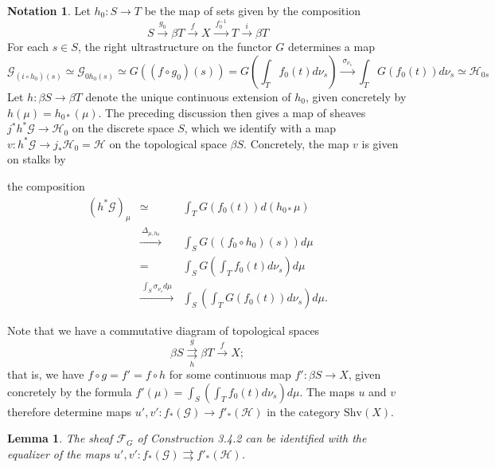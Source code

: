 \documentclass[11pt]{article}
\theoremstyle{plain}
\newtheorem{lemma}{Lemma}
\theoremstyle{definition}
\newtheorem{notation}{Notation}
\begin{document}
\begin{notation}
Let $h_0 : S \to T$ be the map of sets given by the composition
\[
S \xrightarrow{\ g_0\ } \beta T \xrightarrow{\ f\ } X \xrightarrow{\ f_0^{-1}\ } T \xrightarrow{\ i\ } \beta T
\]
For each $s \in S$, the right ultrastructure on the functor $G$ determines a map
\[
\mathscr{G}_{(i \circ h_0)(s)} \simeq \mathscr{G}_{0h_0(s)} \simeq G((f \circ g_0)(s)) = G(\int_T f_0(t)d\nu_s) \xrightarrow{\ \sigma_{\nu_s}\ } \int_T G(f_0(t))d\nu_s \simeq \mathscr{H}_{0s}
\]
Let $h : \beta S \to \beta T$ denote the unique continuous extension of $h_0$, given concretely by $h(\mu) = h_{0*}(\mu)$. The preceding discussion then gives a map of sheaves $j^*h^*\mathscr{G} \to \mathscr{H}_0$ on the discrete space $S$, which we identify with a map $v : h^*\mathscr{G} \to j_*\mathscr{H}_0 = \mathscr{H}$ on the topological space $\beta S$. Concretely, the map $v$ is given on stalks by


the composition
\[
\begin{array}{rcl}
(h^*\mathscr{G})_\mu & \simeq & \int_T G(f_0(t))d(h_{0*}\mu)\\[4pt]
& \xrightarrow{\ \Delta_{\mu,h_0}\ } & \int_S G((f_0 \circ h_0)(s))d\mu\\[4pt]
& = & \int_S G(\int_T f_0(t)d\nu_s)d\mu\\[4pt]
& \xrightarrow{\ \int_S \sigma_{\nu_s}d\mu\ } & \int_S (\int_T G(f_0(t))d\nu_s)d\mu.
\end{array}
\]
\end{notation}

Note that we have a commutative diagram of topological spaces
\[
\beta S \underset{h}{\overset{g}{\rightrightarrows}} \beta T \xrightarrow{\ f\ } X;
\]
that is, we have $f \circ g = f' = f \circ h$ for some continuous map $f' : \beta S \to X$, given concretely by the formula $f'(\mu) = \int_S (\int_T f_0(t)d\nu_s)d\mu$. The maps $u$ and $v$ therefore determine maps $u', v' : f_*(\mathscr{G}) \to f'_*(\mathscr{H})$ in the category $\mathrm{Shv}(X)$.

\renewcommand{\thelemma}{3.5.3}
\begin{lemma}
The sheaf $\mathscr{F}_G$ of Construction 3.4.2 can be identified with the equalizer of the maps $u', v' : f_*(\mathscr{G}) \rightrightarrows f'_*(\mathscr{H})$.
\end{lemma}
\end{document}
